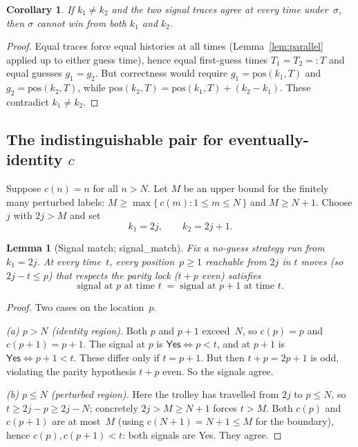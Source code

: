 \documentclass{article}
\newtheorem{lemma}[theorem]{Lemma}
\newtheorem{corollary}[theorem]{Corollary}
\newcommand{\Yes}{\textsf{Yes}}
\newcommand{\us}{\discretionary{}{}{}\_\discretionary{}{}{}}
\newcommand{\lean}[1]{{\small\ttfamily #1}}
\begin{document}
\begin{corollary}\label{cor:notboth}
If $k_1\neq k_2$ and the two signal traces agree at \emph{every} time
under~$\sigma$, then $\sigma$ cannot win from both $k_1$ and $k_2$.
\end{corollary}
\begin{proof}
Equal traces force equal histories at all times (Lemma~\ref{lem:parallel}
applied up to either guess time), hence equal first-guess times
$T_1=T_2=:T$ and equal guesses $g_1=g_2$. But correctness would require
$g_1 = \mathrm{pos}(k_1,T)$ and $g_2=\mathrm{pos}(k_2,T)$, while
$\mathrm{pos}(k_2,T)=\mathrm{pos}(k_1,T)+(k_2-k_1)$. These contradict
$k_1\neq k_2$.
\end{proof}

\subsection{The indistinguishable pair for eventually-identity \texorpdfstring{$c$}{c}}

Suppose $c(n)=n$ for all $n>N$. Let $M$ be an upper bound for the finitely
many perturbed labels: $M \ge \max\{\,c(m) : 1\le m\le N\,\}$ and $M\ge
N+1$. Choose $j$ with $2j > M$ and set
\[
  k_1 = 2j, \qquad k_2 = 2j+1 .
\]

\begin{lemma}[Signal match; \lean{signal\us match}]\label{lem:sigmatch}
Fix a no-guess strategy run from $k_1=2j$. At every time~$t$, every
position~$p\ge 1$ reachable from $2j$ in $t$ moves (so $2j - t \le p$)
that respects the parity lock ($t+p$ even) satisfies
\[
  \text{signal at } p \text{ at time } t \;=\;
  \text{signal at } p{+}1 \text{ at time } t .
\]
\end{lemma}
\begin{proof}
Two cases on the location~$p$.

\emph{(a) $p > N$ (identity region).} Both $p$ and $p{+}1$ exceed~$N$, so
$c(p)=p$ and $c(p{+}1)=p{+}1$. The signal at $p$ is $\Yes \iff p<t$, and
at $p{+}1$ is $\Yes\iff p{+}1<t$. These differ only if $t=p+1$. But then
$t+p = 2p+1$ is odd, violating the parity hypothesis $t+p$ even. So the
signals agree.

\emph{(b) $p \le N$ (perturbed region).} Here the trolley has travelled
from $2j$ to $p\le N$, so $t \ge 2j - p \ge 2j - N$; concretely $2j>M\ge
N+1$ forces $t > M$. Both $c(p)$ and $c(p{+}1)$ are at most~$M$ (using
$c(N{+}1)=N{+}1\le M$ for the boundary), hence $c(p), c(p{+}1) < t$: both
signals are \Yes. They agree.
\end{proof}
\end{document}

